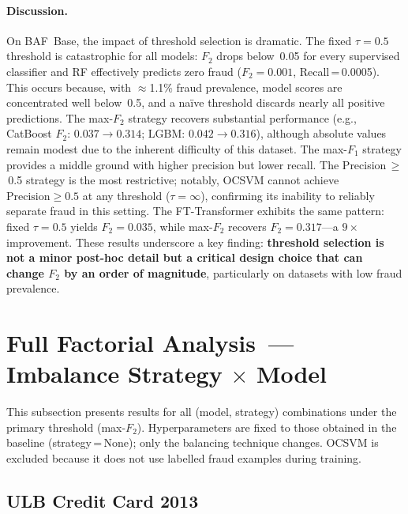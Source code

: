 \paragraph{Discussion.}
On BAF~Base, the impact of threshold selection is dramatic.
The fixed $\tau=0.5$ threshold is catastrophic for all models: $F_2$ drops below~0.05 for every supervised classifier and RF effectively predicts zero fraud ($F_2=0.001$, Recall\,=\,0.0005).
This occurs because, with $\approx$1.1\% fraud prevalence, model scores are concentrated well below~0.5, and a na\"ive threshold discards nearly all positive predictions.
The max-$F_2$ strategy recovers substantial performance (e.g., CatBoost $F_2$: $0.037 \to 0.314$; LGBM: $0.042 \to 0.316$), although absolute values remain modest due to the inherent difficulty of this dataset.
The max-$F_1$ strategy provides a middle ground with higher precision but lower recall.
The Precision\,$\geq$\,0.5 strategy is the most restrictive; notably, OCSVM cannot achieve $\text{Precision} \geq 0.5$ at any threshold ($\tau=\infty$), confirming its inability to reliably separate fraud in this setting.
The FT-Transformer exhibits the same pattern: fixed $\tau=0.5$ yields $F_2=0.035$, while max-$F_2$ recovers $F_2=0.317$---a $9\times$ improvement.
These results underscore a key finding: \textbf{threshold selection is not a minor post-hoc detail but a critical design choice that can change $F_2$ by an order of magnitude}, particularly on datasets with low fraud prevalence.



\section{Full Factorial Analysis~--- Imbalance Strategy \texorpdfstring{$\times$}{x} Model}
\label{sec:factorial_results}

This subsection presents results for all (model, strategy) combinations
under the primary threshold (max-$F_2$).
Hyperparameters are fixed to those obtained in the baseline (strategy\,=\,None);
only the balancing technique changes.
OCSVM is excluded because it does not use labelled fraud examples during training.


\subsection{ULB Credit Card 2013}

